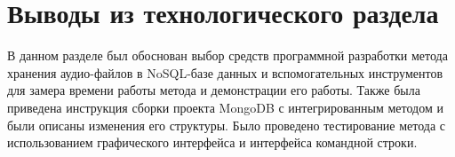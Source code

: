 \section{Выводы из технологического раздела}

В данном разделе был обоснован выбор средств программной разработки метода хранения аудио-файлов в NoSQL-базе данных и вспомогательных инструментов для замера времени работы метода и демонстрации его работы. Также была приведена инструкция сборки проекта MongoDB с интегрированным методом и были описаны изменения его структуры. Было проведено тестирование метода с использованием графического интерфейса и интерфейса командной строки.

